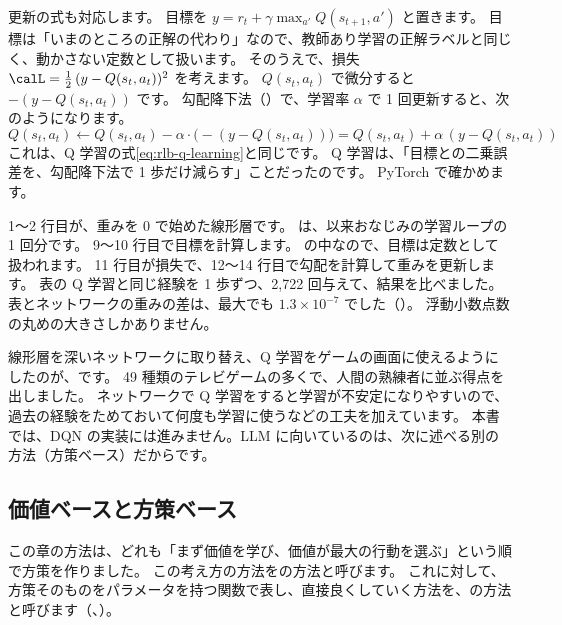 更新の式も対応します。
目標を $y=r_t+\gamma\max_{a'}Q(s_{t+1},a')$ と置きます。
目標は「いまのところの正解の代わり」なので、教師あり学習の正解ラベルと同じく、動かさない定数として扱います。
そのうえで、損失 $\calL=\frac12\,(y-Q(s_t,a_t))^2$ を考えます。
$Q(s_t,a_t)$ で微分すると $-(y-Q(s_t,a_t))$ です。
勾配降下法（）で、学習率 $\alpha$ で 1 回更新すると、次のようになります。
\[
Q(s_t,a_t)\leftarrow Q(s_t,a_t)-\alpha\cdot\bigl(-(y-Q(s_t,a_t))\bigr)=Q(s_t,a_t)+\alpha\,(y-Q(s_t,a_t))
\]
これは、Q 学習の式\eqref{eq:rlb-q-learning}と同じです。
Q 学習は、「目標との二乗誤差を、勾配降下法で 1 歩だけ減らす」ことだったのです。
PyTorch で確かめます。


1〜2 行目が、重みを 0 で始めた線形層です。
 は、以来おなじみの学習ループの 1 回分です。
9〜10 行目で目標を計算します。 の中なので、目標は定数として扱われます。
11 行目が損失で、12〜14 行目で勾配を計算して重みを更新します。
表の Q 学習と同じ経験を 1 歩ずつ、2,722 回与えて、結果を比べました。
表とネットワークの重みの差は、最大でも $1.3\times10^{-7}$ でした（）。
浮動小数点数の丸めの大きさしかありません。

線形層を深いネットワークに取り替え、Q 学習をゲームの画面に使えるようにしたのが、です\cite{mnih2015human}。
49 種類のテレビゲームの多くで、人間の熟練者に並ぶ得点を出しました。
ネットワークで Q 学習をすると学習が不安定になりやすいので、過去の経験をためておいて何度も学習に使うなどの工夫を加えています。
本書では、DQN の実装には進みません。LLM に向いているのは、次に述べる別の方法（方策ベース）だからです。

\subsection*{価値ベースと方策ベース}

この章の方法は、どれも「まず価値を学び、価値が最大の行動を選ぶ」という順で方策を作りました。
この考え方の方法をの方法と呼びます。
これに対して、方策そのものをパラメータを持つ関数で表し、直接良くしていく方法を、の方法と呼びます（、）。


